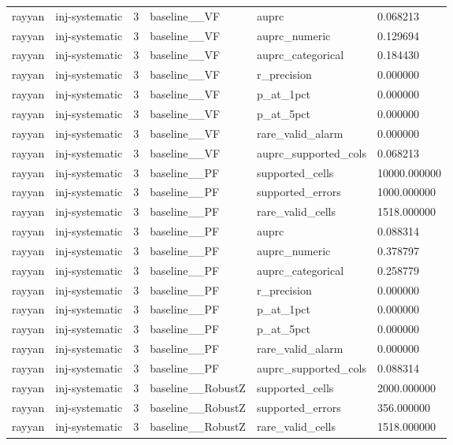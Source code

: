 \begin{tabular}{llllll}
rayyan & inj-systematic & 3 & baseline\_\_VF & auprc & 0.068213 \\
rayyan & inj-systematic & 3 & baseline\_\_VF & auprc\_numeric & 0.129694 \\
rayyan & inj-systematic & 3 & baseline\_\_VF & auprc\_categorical & 0.184430 \\
rayyan & inj-systematic & 3 & baseline\_\_VF & r\_precision & 0.000000 \\
rayyan & inj-systematic & 3 & baseline\_\_VF & p\_at\_1pct & 0.000000 \\
rayyan & inj-systematic & 3 & baseline\_\_VF & p\_at\_5pct & 0.000000 \\
rayyan & inj-systematic & 3 & baseline\_\_VF & rare\_valid\_alarm & 0.000000 \\
rayyan & inj-systematic & 3 & baseline\_\_VF & auprc\_supported\_cols & 0.068213 \\
rayyan & inj-systematic & 3 & baseline\_\_PF & supported\_cells & 10000.000000 \\
rayyan & inj-systematic & 3 & baseline\_\_PF & supported\_errors & 1000.000000 \\
rayyan & inj-systematic & 3 & baseline\_\_PF & rare\_valid\_cells & 1518.000000 \\
rayyan & inj-systematic & 3 & baseline\_\_PF & auprc & 0.088314 \\
rayyan & inj-systematic & 3 & baseline\_\_PF & auprc\_numeric & 0.378797 \\
rayyan & inj-systematic & 3 & baseline\_\_PF & auprc\_categorical & 0.258779 \\
rayyan & inj-systematic & 3 & baseline\_\_PF & r\_precision & 0.000000 \\
rayyan & inj-systematic & 3 & baseline\_\_PF & p\_at\_1pct & 0.000000 \\
rayyan & inj-systematic & 3 & baseline\_\_PF & p\_at\_5pct & 0.000000 \\
rayyan & inj-systematic & 3 & baseline\_\_PF & rare\_valid\_alarm & 0.000000 \\
rayyan & inj-systematic & 3 & baseline\_\_PF & auprc\_supported\_cols & 0.088314 \\
rayyan & inj-systematic & 3 & baseline\_\_RobustZ & supported\_cells & 2000.000000 \\
rayyan & inj-systematic & 3 & baseline\_\_RobustZ & supported\_errors & 356.000000 \\
rayyan & inj-systematic & 3 & baseline\_\_RobustZ & rare\_valid\_cells & 1518.000000 \\

\end{tabular}
